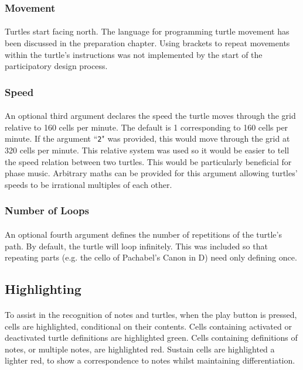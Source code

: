 \subsubsection{Movement}

\paragraph{} Turtles start facing north. The language for programming turtle movement has been discussed in the preparation chapter. Using brackets to repeat movements within the turtle's instructions was not implemented by the start of the participatory design process.

\subsubsection{Speed}

\paragraph{} An optional third argument declares the speed the turtle moves through the grid relative to 160 cells per minute. The default is 1 corresponding to 160 cells per minute. If the argument ``\texttt{2}" was provided, this would move through the grid at 320 cells per minute. This relative system was used so it would be easier to tell the speed relation between two turtles. This would be particularly beneficial for phase music. Arbitrary maths can be provided for this argument allowing turtles' speeds to be irrational multiples of each other.

\subsubsection{Number of Loops}

\paragraph{} An optional fourth argument defines the number of repetitions of the turtle's path. By default, the turtle will loop infinitely. This was included so that repeating parts (e.g. the cello  of Pachabel's Canon in D) need only defining once.

\subsection{Highlighting}

\paragraph{} To assist in the recognition of notes and turtles, when the play button is pressed, cells are highlighted, conditional on their contents. Cells containing activated or deactivated turtle definitions are highlighted green. Cells containing definitions of notes, or multiple notes, are highlighted red. Sustain cells are highlighted a lighter red, to show a correspondence to notes whilst maintaining differentiation.

